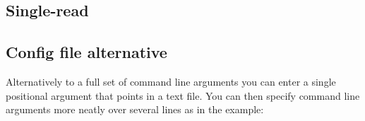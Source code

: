 \documentclass[letterpaper,11pt,english]{sphinxmanual}
\begin{document}
\subsection{Single-read}
\label{\detokenize{intro:single-read}}\begin{quote}

\begin{sphinxVerbatim}[commandchars=\\\{\}]
              
\end{sphinxVerbatim}
\end{quote}


\subsection{Config file alternative}
\label{\detokenize{intro:config-file-alternative}}
Alternatively to a full set of command line arguments you can enter a single positional argument that points in a text file.  You can then specify command line arguments more neatly over several lines as in the example:
\begin{quote}

\begin{sphinxVerbatim}[commandchars=\\\{\}]
 
 
\end{sphinxVerbatim}
\end{quote}
\end{document}
